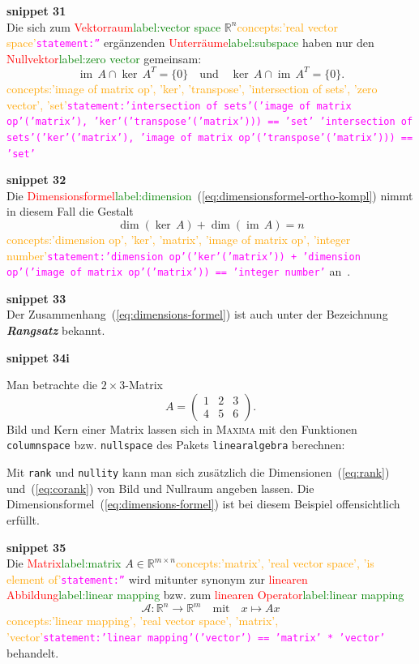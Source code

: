 \documentclass[a4paper,twoside,english,ngerman,deutsch,german,sectrefs,envcountsame,envcountchap]{svmono}
\newcommand{\setref}[2]{\textcolor{red}{#1}\textcolor{green}{#2}}
\newcommand{\snippet}[1]{\textbf{snippet #1}\\}
\newcommand{\eqnote}[2]{\textcolor{orange}{#1}\textcolor{magenta}{\texttt{#2}}}
\begin{document}
\snippet{31}
Die sich zum \setref{Vektorraum}{label:vector space} ${\mathbb{R}}^{n}$\eqnote{concepts:'real vector space'}{statement:''} ergänzenden \setref{Unterräume}{label:subspace} haben nur den \setref{Nullvektor}{label:zero vector} gemeinsam:
\[
{\operatorname{im}}\,A\cap\ker\,A^{T}=\{0\}\quad\text{und}\quad\ker\,A\cap{\operatorname{im}}\,A^{T}=\{0\}.
\]\eqnote{concepts:'image of matrix op', 'ker', 'transpose', 'intersection of sets', 'zero vector', 'set'}{statement:'intersection of sets'('image of matrix op'('matrix'), 'ker'('transpose'('matrix'))) == 'set'
'intersection of sets'('ker'('matrix'), 'image of matrix op'('transpose'('matrix'))) == 'set'}

\snippet{32}
Die \setref{Dimensionsformel}{label:dimension}~(\eqref{eq:dimensionsformel-ortho-kompl}) nimmt in diesem Fall die Gestalt
\begin{equation}
\dim(\ker\,A)+\dim({\operatorname{im}}\,A)=n\label{eq:dimensions-formel}
\end{equation}\eqnote{concepts:'dimension op', 'ker', 'matrix', 'image of matrix op', 'integer number'}{statement:'dimension op'('ker'('matrix')) + 'dimension op'('image of matrix op'('matrix')) == 'integer number'}
an~\cite{lorenz1992,beutelspacher2001}.

\snippet{33}
Der Zusammenhang~(\eqref{eq:dimensions-formel}) ist auch unter der Bezeichnung \textbf{\em Rangsatz} bekannt.

\snippet{34i}


\begin{example}
\label{exa:Bild-und-Kern}Man betrachte die $2\times3$-Matrix
\[
A=\left(\begin{array}{ccc} 1 & 2 & 3\\ 4 & 5 & 6
\end{array}\right).
\]
Bild und Kern einer Matrix lassen sich in \textsc{Maxima} mit den Funktionen \texttt{columnspace} bzw. \texttt{nullspace} des Pakets
\texttt{linearalgebra} berechnen:



Mit \texttt{rank} und \texttt{nullity} kann man sich zusätzlich die Dimensionen~(\eqref{eq:rank}) und~(\eqref{eq:corank}) von Bild und Nullraum angeben lassen. Die Dimensionsformel~(\eqref{eq:dimensions-formel}) ist bei diesem Beispiel offensichtlich erfüllt.

\end{example}


\snippet{35}
Die \setref{Matrix}{label:matrix} $A\in{\mathbb{R}}^{m\times n}$\eqnote{concepts:'matrix', 'real vector space', 'is element of'}{statement:''} wird mitunter synonym zur \setref{linearen Abbildung}{label:linear mapping} bzw. zum \setref{linearen Operator}{label:linear mapping}
\[
\mathcal{A}:{\mathbb{R}}^{n}\to{\mathbb{R}}^{m}\quad\text{mit}\quad x\mapsto Ax
\]\eqnote{concepts:'linear mapping', 'real vector space', 'matrix', 'vector'}{statement:'linear mapping'('vector') == 'matrix' * 'vector'}
behandelt.
\end{document}
